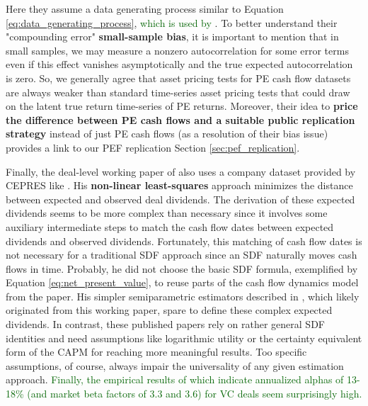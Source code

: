Here they assume a data generating process similar to Equation \ref{eq:data_generating_process}, \textcolor{darkgreen}{which is used by \cite{ACGP18}}.
To better understand their "compounding error" \textbf{small-sample bias}, it is important to mention that in small samples, we may measure a nonzero autocorrelation for some error terms even if this effect vanishes asymptotically and the true expected autocorrelation is zero.
So, we generally agree that asset pricing tests for PE cash flow datasets are always weaker than standard time-series asset pricing tests that could draw on the latent true return time-series of PE returns.
Moreover, their idea to \textbf{price the difference between PE cash flows and a suitable public replication strategy} instead of just PE cash flows (as a resolution of their bias issue) provides a link to our PEF replication Section \ref{sec:pef_replication}.


Finally, the deal-level working paper of \cite{B14} also uses a company dataset provided by CEPRES like \cite{FNP12}.
His \textbf{non-linear least-squares} approach minimizes the distance between expected and observed deal dividends.
The derivation of these expected dividends seems to be more complex than necessary since it involves some auxiliary intermediate steps to match the cash flow dates between expected dividends and observed dividends.
Fortunately, this matching of cash flow dates is not necessary for a traditional SDF approach since an SDF naturally moves cash flows in time. 
Probably, he did not choose the basic SDF formula, exemplified by Equation \ref{eq:net_present_value}, to reuse parts of the cash flow dynamics model from the \cite{BKW10} paper.
His simpler semiparametric estimators described in \cite{B16a,B16b}, which likely originated from this \cite{B14} working paper, spare to define these complex expected dividends.
In contrast, these published papers rely on rather general SDF identities and need assumptions like logarithmic utility \citep{B16a} or the certainty equivalent form of the CAPM \citep{B16b} for reaching more meaningful results.
Too specific assumptions, of course, always impair the universality of any given estimation approach.
\textcolor{darkgreen}{
	Finally, the empirical results of \cite{B16a} which indicate annualized alphas of 13-18\% (and market beta factors of 3.3 and 3.6) for VC deals seem surprisingly high.
}
